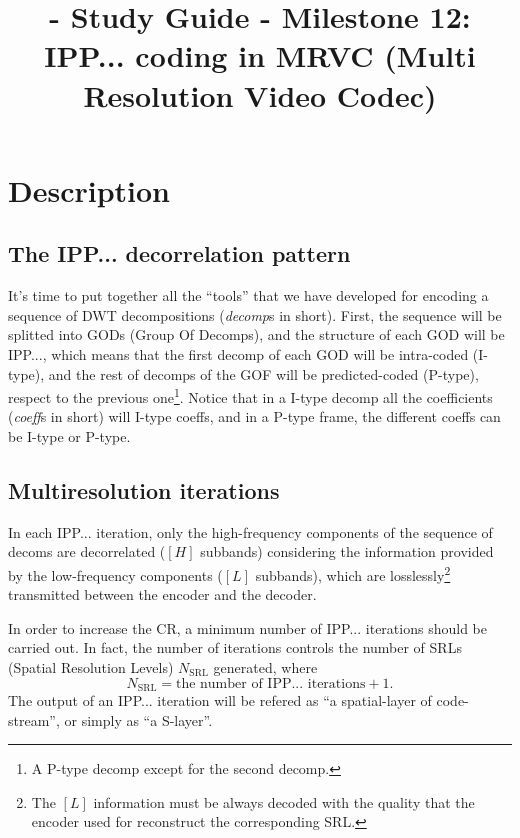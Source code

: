 
\title{\SM{} - Study Guide - Milestone 12: IPP... coding in MRVC (Multi Resolution Video Codec)}

\maketitle

\section{Description}

\subsection{The IPP... decorrelation pattern}
It's time to put together all the ``tools'' that we have developed for
encoding a sequence of DWT decompositions (\emph{decomp}s in
short). First, the sequence will be splitted into GODs (Group Of
Decomps), and the structure of each GOD will be IPP..., which means
that the first decomp of each GOD will be intra-coded (I-type), and
the rest of decomps of the GOF will be predicted-coded (P-type),
respect to the previous one\footnote{A P-type decomp except for the
second decomp.}. Notice that in a I-type decomp all the coefficients
(\emph{coeff}s in short) will I-type coeffs, and in a P-type frame,
the different coeffs can be I-type or P-type.

\subsection{Multiresolution iterations}
In each IPP... iteration, only the high-frequency components of the
sequence of decoms are decorrelated ($[H]$ subbands) considering the
information provided by the low-frequency components ($[L]$ subbands),
which are losslessly\footnote{The $[L]$ information must be always
decoded with the quality that the encoder used for reconstruct the
corresponding SRL.} transmitted between the encoder and the decoder.

In order to increase the CR, a minimum number of IPP... iterations
should be carried out. In fact, the number of iterations controls the
number of SRLs (Spatial Resolution Levels) $N_{\text{SRL}}$ generated,
where
\begin{equation}
  N_{\text{SRL}} = \text{the number of IPP... iterations} + 1.
\end{equation}
The output of an IPP... iteration will be refered as ``a
spatial-layer of code-stream'', or simply as ``a S-layer''.

